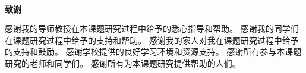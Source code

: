\cleardoublepage

\begin{center}
    ~\\[-1.5em]
    \textbf{致\quad 谢}
\end{center}


\par 感谢我的导师\teaname 教授在本课题研究过程中给予的悉心指导和帮助。
感谢我的同学们在课题研究过程中给予的支持和帮助。
感谢我的家人对我在课题研究过程中给予的支持和鼓励。
感谢学校提供的良好学习环境和资源支持。
感谢所有参与本课题研究的老师和同学们。
感谢所有为本课题研究提供帮助的人们。